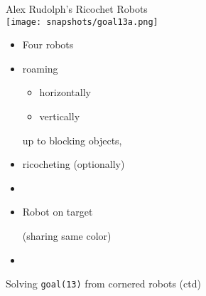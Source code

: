 \begin{frame}[c]{Alex Rudolph's Ricochet Robots\\[-5pt]\footnotesize
    }
  \bigskip\qquad\texttt{[image: snapshots/goal13a.png]}
  \qquad
  \begin{minipage}[b]{0.4\linewidth}
    \begin{itemize}
    \item<2-> Four robots
    \item<2->[] roaming
      \begin{itemize}
      \item horizontally
      \item vertically
      \end{itemize}
      up to blocking objects,
    \item<2->[] ricocheting (optionally)
    \item<2-> []
    \item<3->  Robot on target\par (sharing same color)
    \item []
    \end{itemize}
  \end{minipage}
\end{frame}
\begin{frame}{Solving \lstinline{goal(13)} from cornered robots (ctd)}
  \bigskip\quad
  \quad
  \quad
  \quad
  \\\bigskip\quad
  \quad
  \quad
  \quad
\end{frame}

